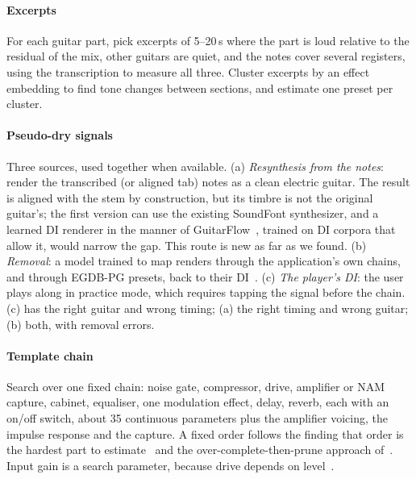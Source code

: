 \paragraph{Excerpts} For each guitar part, pick excerpts of 5--20\,s where the
part is loud relative to the residual of the mix, other guitars are quiet, and
the notes cover several registers, using the transcription to measure all
three. Cluster excerpts by an effect embedding to find tone changes between
sections, and estimate one preset per cluster.

\paragraph{Pseudo-dry signals} Three sources, used together when available.
(a) \emph{Resynthesis from the notes}: render the transcribed (or aligned tab)
notes as a clean electric guitar. The result is aligned with the stem by
construction, but its timbre is not the original guitar's; the first version
can use the existing SoundFont synthesizer, and a learned DI renderer in the
manner of GuitarFlow~\cite{loth2025guitarflow}, trained on DI corpora that
allow it, would narrow the gap. This route is new as far as we found. (b)
\emph{Removal}: a model trained to map renders through the application's own
chains, and through EGDB-PG presets, back to their DI~\cite{lee2024distortion,yeh2026egvae}.
(c) \emph{The player's DI}: the user plays along in practice mode, which
requires tapping the signal before the chain. (c) has the right guitar and
wrong timing; (a) the right timing and wrong guitar; (b) both, with removal
errors.

\paragraph{Template chain} Search over one fixed chain: noise gate,
compressor, drive, amplifier or NAM capture, cabinet, equaliser, one
modulation effect, delay, reverb, each with an on/off switch, about 35
continuous parameters plus the amplifier voicing, the impulse response and the
capture. A fixed order follows the finding that order is the hardest part to
estimate~\cite{wada2025hyperbolic} and the over-complete-then-prune approach
of~\cite{lee2025reverse}. Input gain is a search parameter, because drive
depends on level~\cite{sd4562026nameqmatch}.

